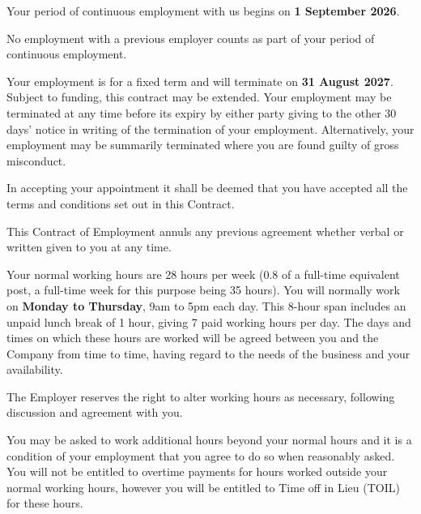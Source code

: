 \documentclass[a4paper,11pt,onecolumn ]{article}
\begin{document}
\begin{legal}
\item {}
\begin{legal}
  \item Your period of continuous employment with us begins on \textbf{1 September 2026}.
  \item No employment with a previous employer counts as part of your period of
  continuous employment.
  \item Your employment is for a fixed term and will terminate on \textbf{31 August 2027}.
  Subject to funding, this contract may be extended. Your employment may be
  terminated at any time before its expiry by either party giving to the other 30
  days’ notice in writing of the termination of your employment. Alternatively,
  your employment may be summarily terminated where you are found guilty of
  gross misconduct.
  \item In accepting your appointment it shall be deemed that you have accepted all the
  terms and conditions set out in this Contract.
  \item This Contract of Employment annuls any previous agreement whether verbal or
  written given to you at any time.
\end{legal}


\item {}
\begin{legal}
\item Your normal working hours are 28 hours per week (0.8 of a full-time equivalent post, a
full-time week for this purpose being 35 hours). You will normally work on \textbf{Monday to
Thursday}, 9am to 5pm each day. This 8-hour span includes an unpaid lunch break of 1
hour, giving 7 paid working hours per day. The days and times on which these hours are
worked will be agreed between you and the Company from time to time, having regard to the
needs of the business and your availability.
\item The Employer reserves the right to alter working hours as necessary, following
discussion and agreement with you.
\item You may be asked to work additional hours beyond your normal hours and it is
a condition of your employment that you agree to do so when reasonably asked.
You will not be entitled to overtime payments for hours worked outside your
normal working hours, however you will be entitled to Time off in Lieu (TOIL) for these 
hours.
\end{legal}



\end{legal}
\end{document}
